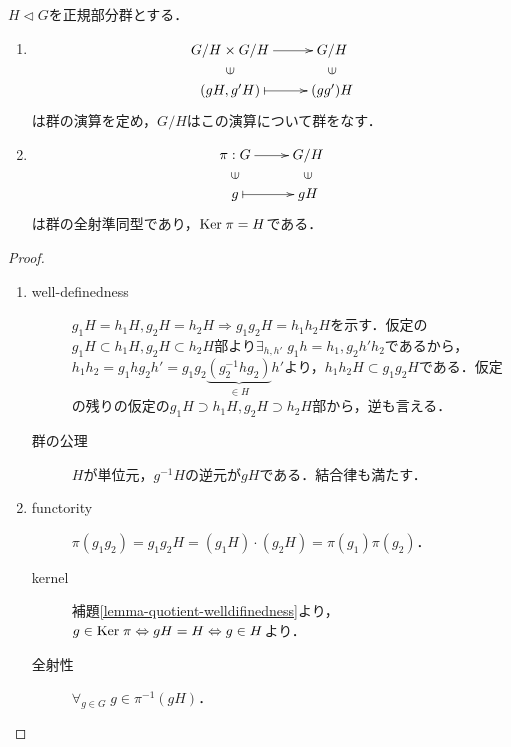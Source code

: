 \documentclass[uplatex,dvipdfmx]{jsreport}
\begin{document}
\begin{theorem}
    $H\triangleleft G$を正規部分群とする．
    \begin{enumerate}
        \item \[\xymatrix@R-2pc{
            G/H\times G/H\ar[r]&G/H\\
            \rotatebox[origin=c]{90}{$\in$}&\rotatebox[origin=c]{90}{$\in$}\\
            (gH,g'H)\ar@{|->}[r]&(gg')H
        }\]
        は群の演算を定め，$G/H$はこの演算について群をなす．
        \item \[\xymatrix@R-2pc{
            \pi:G\ar[r]&G/H\\
            \rotatebox[origin=c]{90}{$\in$}&\rotatebox[origin=c]{90}{$\in$}\\
            g\ar@{|->}[r]&gH
        }\]
        は群の全射準同型であり，$\mathrm{Ker}\;\pi=H$である．
    \end{enumerate}
\end{theorem}
\begin{proof}\mbox{}
    \begin{enumerate}
        \item \begin{description}
            \item[well-definedness] $g_1H=h_1H,g_2H=h_2H\Rightarrow g_1g_2H=h_1h_2H$を示す．仮定の$g_1H\subset h_1H,g_2H\subset h_2H$部より$\exists_{h,h'}\;g_1h=h_1,g_2h'h_2$であるから，$h_1h_2=g_1hg_2h'=g_1g_2\underbrace{(g_2^{-1}hg_2)}_{\in H}h'$より，$h_1h_2H\subset g_1g_2H$である．仮定の残りの仮定の$g_1H\supset h_1H,g_2H\supset h_2H$部から，逆も言える．
            \item[群の公理] $H$が単位元，$g^{-1}H$の逆元が$gH$である．結合律も満たす．
        \end{description}
        \item \begin{description}
            \item[functority] $\pi(g_1g_2)=g_1g_2H=(g_1H)\cdot(g_2H)=\pi(g_1)\pi(g_2)$．
            \item[kernel] 補題\ref{lemma-quotient-welldifinedness}より，$g\in\mathrm{Ker}\;\pi\Leftrightarrow gH=H\Leftrightarrow g\in H$より．
            \item[全射性] $\forall_{g\in G}\;g\in\pi^{-1}(gH)$．
        \end{description}
    \end{enumerate}
\end{proof}
\end{document}
